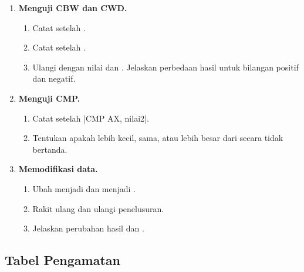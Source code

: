 \begin{enumerate}
    \item \textbf{Menguji CBW dan CWD.}
    \begin{enumerate}
        \item Catat  setelah .
        \item Catat  setelah .
        \item Ulangi dengan nilai  dan . Jelaskan
              perbedaan hasil untuk bilangan positif dan negatif.
    \end{enumerate}

    \item \textbf{Menguji CMP.}
    \begin{enumerate}
        \item Catat  setelah \lstasm|CMP AX, nilai2|.
        \item Tentukan apakah  lebih kecil, sama, atau lebih
              besar dari  secara tidak bertanda.
    \end{enumerate}

    \item \textbf{Memodifikasi data.}
    \begin{enumerate}
        \item Ubah  menjadi  dan
               menjadi .
        \item Rakit ulang dan ulangi penelusuran.
        \item Jelaskan perubahan hasil  dan .
    \end{enumerate}
\end{enumerate}

\subsection{Tabel Pengamatan}

